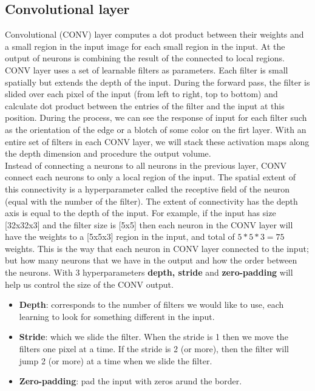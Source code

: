 \subsection{Convolutional layer}
Convolutional (CONV) layer computes a dot product between their weights and a small region in the input image for each small region in the input. At the output of neurons is combining the result  of the connected to local regions.\\[0.2cm]
CONV layer uses a set of learnable filters as parameters. Each filter is small spatially but extends the depth of the input. During the forward pass, the filter is slided over each pixel of the input (from left to right, top to bottom) and calculate dot product between the entries of the filter and the input at this position. During the process, we can see the response of input for each filter such as the orientation of the edge or a blotch of some color on the firt layer. With an entire set of filters in each CONV layer, we will stack these activation maps along the depth dimension and procedure the output volume.\\[0.2cm]
Instead of connecting a neurons to all neurons in the previous layer, CONV connect each neurons to only a local region of the input. The spatial extent of this connectivity is a hyperparameter called the receptive field of the neuron (equal with the number of the filter). The extent of connectivity has the depth axis is equal to the depth of the input. For example, if the input has size [32x32x3] and the filter size is [5x5] then each neuron in the CONV layer will have the weights to a [5x5x3] region in the input, and total of $5*5*3 = 75$ weights. This is the way that each neuron in CONV layer connected to the input; but how many neurons that we have in the output and how the order between the neurons. With 3 hyperparameters \textbf{depth, stride} and \textbf{zero-padding} will help us control the size of the CONV output.
\begin{itemize}
	\item \textbf{Depth}: corresponds to the number of filters we would like to use, each learning to look for something different in the input.
	\item \textbf{Stride}:  which we slide the filter. When the stride is 	1 then we move the filters one pixel at a time. If the stride is 2 (or more), then the filter will jump 2 (or more) at a time when we slide the filter.
	\item \textbf{Zero-padding}: pad the input with zeros arund the border.
\end{itemize}

